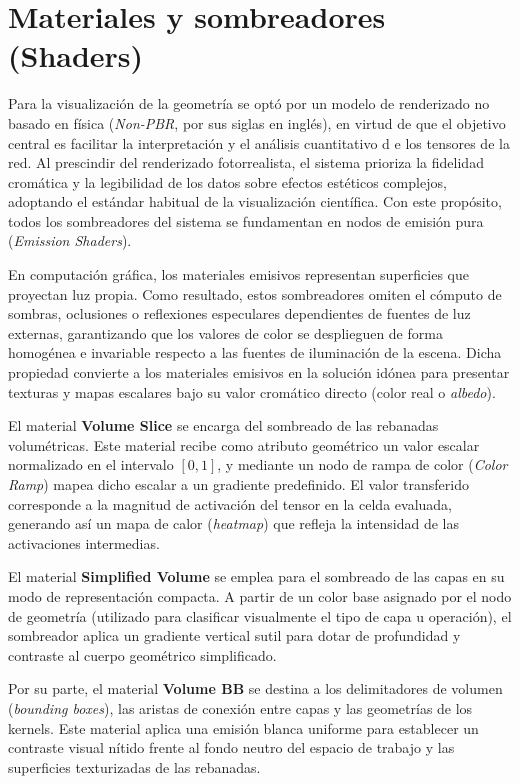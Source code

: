 \section{Materiales y sombreadores (Shaders)}
Para la visualización de la geometría se optó por un modelo de renderizado no basado en física (\textit{Non-PBR}, 
por sus siglas en inglés), en virtud de que el objetivo central es facilitar la interpretación y el análisis cuantitativo d
e los tensores de la red. Al prescindir del renderizado fotorrealista, el sistema prioriza la fidelidad cromática y la 
legibilidad de los datos sobre efectos estéticos complejos, adoptando el estándar habitual de la visualización científica. 
Con este propósito, todos los sombreadores del sistema se fundamentan en nodos de emisión pura (\textit{Emission Shaders}).
\medskip

En computación gráfica, los materiales emisivos representan superficies que proyectan luz propia. Como resultado, estos 
sombreadores omiten el cómputo de sombras, oclusiones o reflexiones especulares dependientes de fuentes de luz externas, 
garantizando que los valores de color se desplieguen de forma homogénea e invariable respecto a las fuentes de iluminación
de la escena. Dicha propiedad convierte a los materiales emisivos en la solución idónea para presentar texturas y 
mapas escalares bajo su valor cromático directo (color real o \textit{albedo}).
\medskip

El material \textbf{Volume Slice} se encarga del sombreado de las rebanadas volumétricas. Este material recibe como atributo 
geométrico un valor escalar normalizado en el intervalo $[0, 1]$, y mediante un nodo de rampa de color (\textit{Color Ramp}) 
mapea dicho escalar a un gradiente predefinido. El valor transferido corresponde a la magnitud de activación del tensor en 
la celda evaluada, generando así un mapa de calor (\textit{heatmap}) que refleja la intensidad de las activaciones intermedias.
\medskip

El material \textbf{Simplified Volume} se emplea para el sombreado de las capas en su modo de representación compacta. A 
partir de un color base asignado por el nodo de geometría (utilizado para clasificar visualmente el tipo de capa u operación), 
el sombreador aplica un gradiente vertical sutil para dotar de profundidad y contraste al cuerpo geométrico simplificado.
\medskip

Por su parte, el material \textbf{Volume BB} se destina a los delimitadores de volumen (\textit{bounding boxes}), las aristas 
de conexión entre capas y las geometrías de los kernels. Este material aplica una emisión blanca uniforme para establecer un 
contraste visual nítido frente al fondo neutro del espacio de trabajo y las superficies texturizadas de las rebanadas.
\medskip

